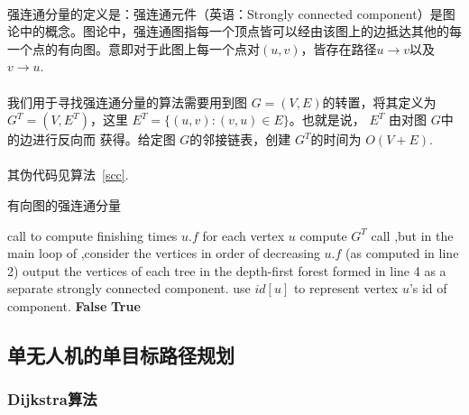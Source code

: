 \documentclass[UTF8,a4paper]{ctexart}
\begin{document}
\paragraph{}强连通分量的定义是：强连通元件（英语：Strongly connected component）是图论中的概念。图论中，强连通图指每一个顶点皆可以经由该图上的边抵达其他的每一个点的有向图。意即对于此图上每一个点对$(u,v)$，皆存在路径$u\to v$以及$v\to u$.
\paragraph{}我们用于寻找强连通分量的算法需要用到图 $G=(V, E)$的转置，将其定义为 $G^T=(V,E^T)$，这里 $E^T=\{(u, v): (v, u) \in E\}$。也就是说， $E^T$ 由对图 $G$中的边进行反向而 获得。给定图 $G$的邻接链表，创建 $G^T$的时间为 $O(V+E)$.
\paragraph{}其伪代码见算法~\ref{scc}.
\begin{algorithm}
    \caption{有向图的强连通分量}\label{scc}
    \begin{algorithmic}[1] %
        \State call  to compute finishing times {$u.f$} for each vertex {$u$}
        \State compute {$G^T$}
        \State call ,but in the main loop of ,consider the vertices in order of decreasing {$u.f$} (as computed in line 2)
        \State output the vertices of each tree in the depth-first forest formed in line 4 as a separate strongly connected component. use $id[u]$ to represent vertex $u$'s id of component.
        \EndFunction
        \State
        \State {}
        \EndFunction
        \State
        \State {}
        \EndFunction
        \State
        \State \Return \textbf{False}
        \EndIf
        \EndFor
        \State \Return \textbf{True}
        \EndFunction
    \end{algorithmic}
\end{algorithm}

\subsection{单无人机的单目标路径规划}
\subsubsection{Dijkstra算法}\label{sec:dijkstra}
\end{document}
